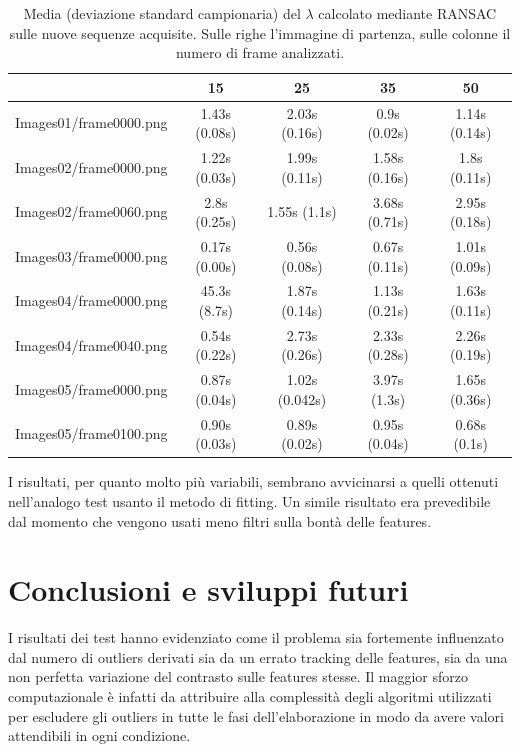 \documentclass[12pt]{report}
\begin{document}
\begin{table}[H]
\begin{center}
\begin{tabular}{|c|c|c|c|c|}
	\hline
	& 15 & 25 & 35 & 50 \\ \hline
	Images01/frame0000.png & 1.43s (0.08s) & 2.03s (0.16s) & 0.9s (0.02s) & 1.14s (0.14s)\\ \hline
	Images02/frame0000.png & 1.22s (0.03s) & 1.99s (0.11s) & 1.58s (0.16s) & 1.8s (0.11s)\\ \hline
	Images02/frame0060.png & 2.8s (0.25s) & 1.55s (1.1s) & 3.68s (0.71s) & 2.95s (0.18s)\\ \hline
	Images03/frame0000.png & 0.17s (0.00s) & 0.56s (0.08s) & 0.67s (0.11s) & 1.01s (0.09s)\\ \hline
	Images04/frame0000.png & 45.3s (8.7s) & 1.87s (0.14s) & 1.13s (0.21s) & 1.63s (0.11s)\\ \hline
	Images04/frame0040.png & 0.54s (0.22s) & 2.73s (0.26s) & 2.33s (0.28s) & 2.26s (0.19s)\\ \hline
	Images05/frame0000.png & 0.87s (0.04s) & 1.02s (0.042s) & 3.97s (1.3s) & 1.65s (0.36s)\\ \hline
	Images05/frame0100.png & 0.90s (0.03s) & 0.89s (0.02s) & 0.95s (0.04s) & 0.68s (0.1s)\\ \hline
\end{tabular}
\caption{Media (deviazione standard campionaria) del $\lambda$ calcolato mediante RANSAC sulle nuove sequenze acquisite. Sulle righe l'immagine di partenza, sulle colonne il numero di frame analizzati.}
\label{tab:ransNew}
\end{center}
\end{table}

\noindent I risultati, per quanto molto pi\`u variabili, sembrano avvicinarsi a quelli ottenuti nell'analogo test usanto il metodo di fitting. Un simile risultato era prevedibile dal momento che vengono usati meno filtri sulla bont\`a delle features.



\chapter{Conclusioni e sviluppi futuri}

\noindent I risultati dei test hanno evidenziato come il problema sia fortemente influenzato dal numero di outliers derivati sia da un errato tracking delle features, sia da una non perfetta variazione del contrasto sulle features stesse. Il maggior sforzo computazionale \`e infatti da attribuire alla complessit\`a degli algoritmi utilizzati per escludere gli outliers in tutte le fasi dell'elaborazione in modo da avere valori attendibili in ogni condizione.\\
\end{document}
